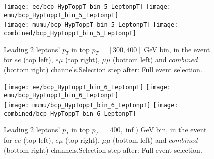 \documentclass[12pt, a4paper, titlepage]{article}
\begin{document}
\begin{figure}
  \texttt{[image: ee/bcp\_HypToppT\_bin\_5\_LeptonpT]}
  \texttt{[image: emu/bcp\_HypToppT\_bin\_5\_LeptonpT]}\\
  \texttt{[image: mumu/bcp\_HypToppT\_bin\_5\_LeptonpT]}
  \texttt{[image: combined/bcp\_HypToppT\_bin\_5\_LeptonpT]}
\caption{Leading 2 leptons' $p_T$ in top $p_T = [300,400]$ GeV bin, in the event for $ee$ (top left), $e\mu$ (top right), $\mu\mu$ (bottom left) and $combined$ (bottom right) channels.\newline Selection step after: Full event selection.}
\end{figure}

\clearpage
\newpage

\begin{figure}
  \texttt{[image: ee/bcp\_HypToppT\_bin\_6\_LeptonpT]}
  \texttt{[image: emu/bcp\_HypToppT\_bin\_6\_LeptonpT]}\\
  \texttt{[image: mumu/bcp\_HypToppT\_bin\_6\_LeptonpT]}
  \texttt{[image: combined/bcp\_HypToppT\_bin\_6\_LeptonpT]}
\caption{Leading 2 leptons' $p_T$ in top $p_T = [400,\inf)$ GeV bin, in the event for $ee$ (top left), $e\mu$ (top right), $\mu\mu$ (bottom left) and $combined$ (bottom right) channels.\newline Selection step after: Full event selection.}
\end{figure}

\clearpage
\newpage







% 
\end{document}
